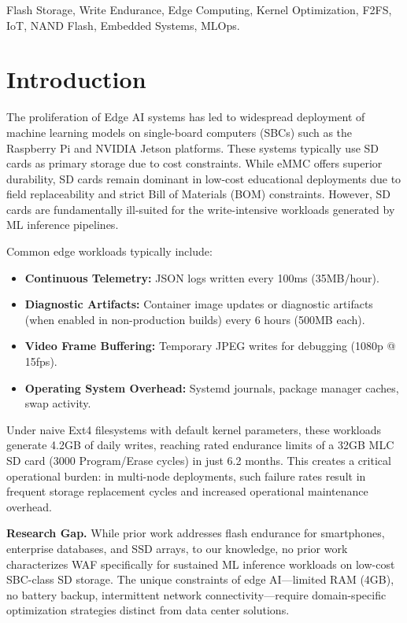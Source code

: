 \documentclass[conference]{IEEEtran}
\begin{document}
\begin{IEEEkeywords}
Flash Storage, Write Endurance, Edge Computing, Kernel Optimization, F2FS, IoT, NAND Flash, Embedded Systems, MLOps.
\end{IEEEkeywords}

\section{Introduction}

The proliferation of Edge AI systems has led to widespread deployment of machine learning models on single-board computers (SBCs) such as the Raspberry Pi and NVIDIA Jetson platforms. These systems typically use SD cards as primary storage due to cost constraints. While eMMC offers superior durability, SD cards remain dominant in low-cost educational deployments due to field replaceability and strict Bill of Materials (BOM) constraints. However, SD cards are fundamentally ill-suited for the write-intensive workloads generated by ML inference pipelines.

Common edge workloads typically include:
\begin{itemize}
    \item \textbf{Continuous Telemetry:} JSON logs written every 100ms (35MB/hour).
    \item \textbf{Diagnostic Artifacts:} Container image updates or diagnostic artifacts (when enabled in non-production builds) every 6 hours (500MB each).
    \item \textbf{Video Frame Buffering:} Temporary JPEG writes for debugging (1080p @ 15fps).
    \item \textbf{Operating System Overhead:} Systemd journals, package manager caches, swap activity.
\end{itemize}

Under naive Ext4 filesystems with default kernel parameters, these workloads generate 4.2GB of daily writes, reaching rated endurance limits of a 32GB MLC SD card (3000 Program/Erase cycles) in just 6.2 months. This creates a critical operational burden: in multi-node deployments, such failure rates result in frequent storage replacement cycles and increased operational maintenance overhead.

\textbf{Research Gap.} While prior work addresses flash endurance for smartphones, enterprise databases, and SSD arrays, to our knowledge, no prior work characterizes WAF specifically for sustained ML inference workloads on low-cost SBC-class SD storage. The unique constraints of edge AI---limited RAM (4GB), no battery backup, intermittent network connectivity---require domain-specific optimization strategies distinct from data center solutions.
\end{document}
